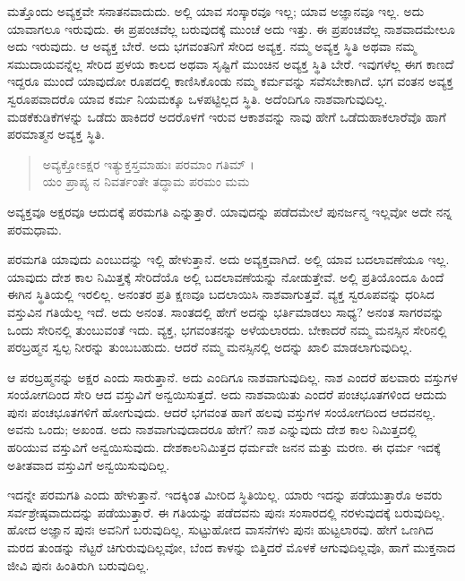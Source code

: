 ಮತ್ತೊಂದು ಅವ್ಯಕ್ತವೇ ಸನಾತನವಾದುದು. ಅಲ್ಲಿ ಯಾವ ಸಂಸ್ಕಾರವೂ ಇಲ್ಲ; ಯಾವ ಅಜ್ಞಾನವೂ ಇಲ್ಲ. ಅದು ಯಾವಾಗಲೂ ಇರುವುದು. ಈ ಪ್ರಪಂಚವೆಲ್ಲ ಬರುವುದಕ್ಕೆ ಮುಂಚೆ ಅದು ಇತ್ತು. ಈ ಪ್ರಪಂಚವೆಲ್ಲ ನಾಶವಾದಮೇಲೂ ಅದು ಇರುವುದು. ಆ ಅವ್ಯಕ್ತ ಬೇರೆ. ಅದು ಭಗವಂತನಿಗೆ ಸೇರಿದ ಅವ್ಯಕ್ತ. ನಮ್ಮ ಅವ್ಯಕ್ತ ಸ್ಥಿತಿ ಅಥವಾ ನಮ್ಮ ಸಮುದಾಯವನ್ನೆಲ್ಲ ಸೇರಿದ ಪ್ರಳಯ ಕಾಲದ ಅಥವಾ ಸೃಷ್ಟಿಗೆ ಮುಂಚಿನ ಅವ್ಯಕ್ತ ಸ್ಥಿತಿ ಬೇರೆ. ಇವುಗಳೆಲ್ಲ ಈಗ ಕಾಣದೆ ಇದ್ದರೂ ಮುಂದೆ ಯಾವುದೋ ರೂಪದಲ್ಲಿ ಕಾಣಿಸಿಕೊಂಡು ನಮ್ಮ ಕರ್ಮವನ್ನು ಸವೆಸಬೇಕಾಗಿದೆ. ಭಗ ವಂತನ ಅವ್ಯಕ್ತ ಸ್ವರೂಪವಾದರೊ ಯಾವ ಕರ್ಮ ನಿಯಮಕ್ಕೂ ಒಳಪಟ್ಟಿಲ್ಲದ ಸ್ಥಿತಿ. ಅದೆಂದಿಗೂ ನಾಶವಾಗುವುದಿಲ್ಲ. ಮಡಕೆಕುಡಿಕೆಗಳನ್ನು ಒಡೆದು ಹಾಕಿದರೆ ಅದರೊಳಗೆ ಇರುವ ಆಕಾಶವನ್ನು ನಾವು ಹೇಗೆ ಒಡೆದುಹಾಕಲಾರೆವೊ ಹಾಗೆ ಪರಮಾತ್ಮನ ಅವ್ಯಕ್ತ ಸ್ಥಿತಿ.

\begin{verse}
ಅವ್ಯಕ್ತೋಽಕ್ಷರ ಇತ್ಯುಕ್ತಸ್ತಮಾಹುಃ ಪರಮಾಂ ಗತಿಮ್ ।\\ಯಂ ಪ್ರಾಪ್ಯ ನ ನಿವರ್ತಂತೇ ತದ್ಧಾಮ ಪರಮಂ ಮಮ 
\end{verse}

{\small ಅವ್ಯಕ್ತವೂ ಅಕ್ಷರವೂ ಆದುದಕ್ಕೆ ಪರಮಗತಿ ಎನ್ನುತ್ತಾರೆ. ಯಾವುದನ್ನು ಪಡೆದಮೇಲೆ ಪುನರ್ಜನ್ಮ ಇಲ್ಲವೋ ಅದೇ ನನ್ನ ಪರಮಧಾಮ.}

ಪರಮಗತಿ ಯಾವುದು ಎಂಬುದನ್ನು ಇಲ್ಲಿ ಹೇಳುತ್ತಾನೆ. ಅದು ಅವ್ಯಕ್ತವಾಗಿದೆ. ಅಲ್ಲಿ ಯಾವ ಬದಲಾವಣೆಯೂ ಇಲ್ಲ. ಯಾವುದು ದೇಶ ಕಾಲ ನಿಮಿತ್ತಕ್ಕೆ ಸೇರಿದೆಯೊ ಅಲ್ಲಿ ಬದಲಾವಣೆಯನ್ನು ನೋಡುತ್ತೇವೆ. ಅಲ್ಲಿ ಪ್ರತಿಯೊಂದೂ ಹಿಂದೆ ಈಗಿನ ಸ್ಥಿತಿಯಲ್ಲಿ ಇರಲಿಲ್ಲ. ಅನಂತರ ಪ್ರತಿ ಕ್ಷಣವೂ ಬದಲಾಯಿಸಿ ನಾಶವಾಗುತ್ತವೆ. ವ್ಯಕ್ತ ಸ್ವರೂಪವನ್ನು ಧರಿಸಿದ ವಸ್ತುವಿನ ಗತಿಯೆಲ್ಲ ಇದೆ. ಅದು ಅನಂತ. ಸಾಂತದಲ್ಲಿ ಹೇಗೆ ಅದನ್ನು ಭರ್ತಿಮಾಡಲು ಸಾಧ್ಯ? ಅನಂತ ಸಾಗರವನ್ನು ಒಂದು ಸೇರಿನಲ್ಲಿ ತುಂಬುವಂತೆ ಇದು. ವ್ಯಕ್ತ, ಭಗವಂತನನ್ನು ಅಳೆಯಲಾರದು. ಬೇಕಾದರೆ ನಮ್ಮ ಮನಸ್ಸಿನ ಸೇರಿನಲ್ಲಿ ಪರಬ್ರಹ್ಮನ ಸ್ವಲ್ಪ ನೀರನ್ನು ತುಂಬಬಹುದು. ಆದರೆ ನಮ್ಮ ಮನಸ್ಸಿನಲ್ಲಿ ಅದನ್ನು ಖಾಲಿ ಮಾಡಲಾಗುವುದಿಲ್ಲ.

ಆ ಪರಬ್ರಹ್ಮನನ್ನು ಅಕ್ಷರ ಎಂದು ಸಾರುತ್ತಾನೆ. ಅದು ಎಂದಿಗೂ ನಾಶವಾಗುವುದಿಲ್ಲ. ನಾಶ ಎಂದರೆ ಹಲವಾರು ವಸ್ತುಗಳ ಸಂಯೋಗದಿಂದ ಸೇರಿ ಆದ ವಸ್ತುವಿಗೆ ಅನ್ವಯಿಸುತ್ತದೆ. ಅದು ನಾಶವಾಯಿತು ಎಂದರೆ ಪಂಚಭೂತಗಳಿಂದ ಆದುದು ಪುನಃ ಪಂಚಭೂತಗಳಿಗೆ ಹೋಗುವುದು. ಆದರೆ ಭಗವಂತ ಹಾಗೆ ಹಲವು ವಸ್ತುಗಳ ಸಂಯೋಗದಿಂದ ಆದವನಲ್ಲ. ಅವನು ಒಂದು; ಅಖಂಡ. ಅದು ನಾಶವಾಗುವುದಾದರೂ ಹೇಗೆ? ನಾಶ ಎನ್ನುವುದು ದೇಶ ಕಾಲ ನಿಮಿತ್ತದಲ್ಲಿ ಹರಿಯುವ ವಸ್ತುವಿಗೆ ಅನ್ವಯಿಸುವುದು. ದೇಶಕಾಲನಿಮಿತ್ತದ ಧರ್ಮವೇ ಜನನ ಮತ್ತು ಮರಣ. ಈ ಧರ್ಮ ಇದಕ್ಕೆ ಅತೀತವಾದ ವಸ್ತುವಿಗೆ ಅನ್ವಯಿಸುವುದಿಲ್ಲ.

ಇದನ್ನೇ ಪರಮಗತಿ ಎಂದು ಹೇಳುತ್ತಾನೆ. ಇದಕ್ಕಿಂತ ಮೀರಿದ ಸ್ಥಿತಿಯಿಲ್ಲ. ಯಾರು ಇದನ್ನು ಪಡೆಯುತ್ತಾರೊ ಅವರು ಸರ್ವಶ್ರೇಷ್ಠವಾದುದನ್ನು ಪಡೆಯುತ್ತಾರೆ. ಈ ಗತಿಯನ್ನು ಪಡೆದವನು ಪುನಃ ಸಂಸಾರದಲ್ಲಿ ನರಳುವುದಕ್ಕೆ ಬರುವುದಿಲ್ಲ. ಹೋದ ಅಜ್ಞಾನ ಪುನಃ ಅವನಿಗೆ ಬರುವುದಿಲ್ಲ. ಸುಟ್ಟುಹೋದ ವಾಸನೆಗಳು ಪುನಃ ಹುಟ್ಟಲಾರವು. ಹೇಗೆ ಒಣಗಿದ ಮರದ ತುಂಡನ್ನು ನೆಟ್ಟರೆ ಚಿಗುರುವುದಿಲ್ಲವೋ, ಬೆಂದ ಕಾಳನ್ನು ಬಿತ್ತಿದರೆ ಮೊಳಕೆ ಆಗುವುದಿಲ್ಲವೊ, ಹಾಗೆ ಮುಕ್ತನಾದ ಜೀವಿ ಪುನಃ ಹಿಂತಿರುಗಿ ಬರುವುದಿಲ್ಲ.

